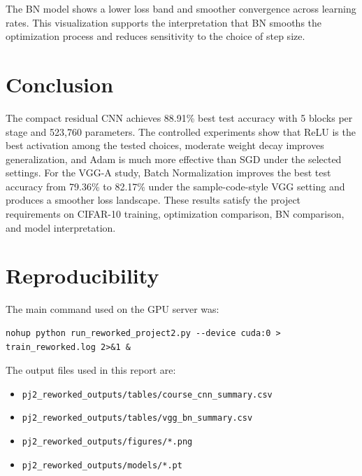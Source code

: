 \documentclass[11pt,a4paper]{article}
\begin{document}
The BN model shows a lower loss band and smoother convergence across learning
rates. This visualization supports the interpretation that BN smooths the
optimization process and reduces sensitivity to the choice of step size.

\section{Conclusion}

The compact residual CNN achieves 88.91\% best test accuracy with 5 blocks per
stage and 523,760 parameters. The controlled experiments show that ReLU is the
best activation among the tested choices, moderate weight decay improves
generalization, and Adam is much more effective than SGD under the selected
settings. For the VGG-A study, Batch Normalization improves the best test
accuracy from 79.36\% to 82.17\% under the sample-code-style VGG setting and
produces a smoother loss landscape. These results satisfy the project
requirements on CIFAR-10 training, optimization comparison, BN comparison, and
model interpretation.

\appendix
\section{Reproducibility}

The main command used on the GPU server was:
\begin{verbatim}
nohup python run_reworked_project2.py --device cuda:0 > train_reworked.log 2>&1 &
\end{verbatim}

The output files used in this report are:
\begin{itemize}
    \item \texttt{pj2\_reworked\_outputs/tables/course\_cnn\_summary.csv}
    \item \texttt{pj2\_reworked\_outputs/tables/vgg\_bn\_summary.csv}
    \item \texttt{pj2\_reworked\_outputs/figures/*.png}
    \item \texttt{pj2\_reworked\_outputs/models/*.pt}
\end{itemize}
\end{document}

